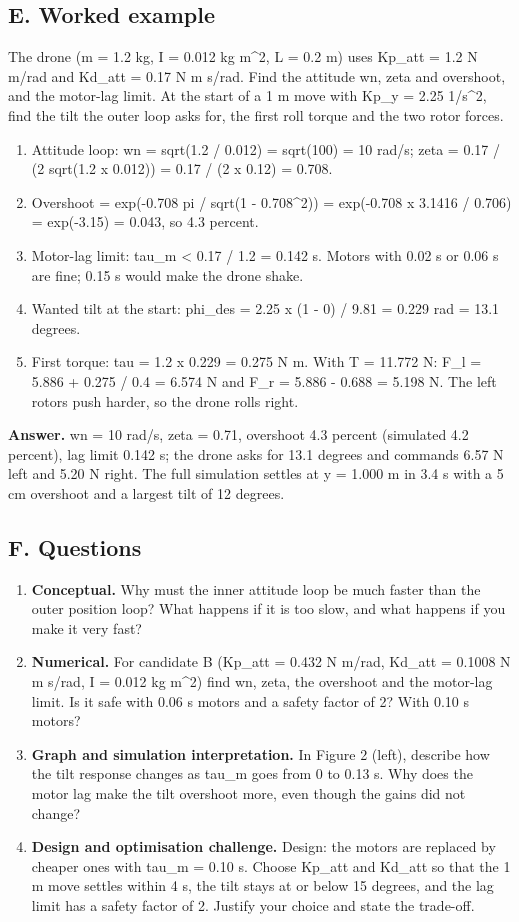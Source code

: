 \documentclass[11pt,a4paper]{article}
\begin{document}
\subsection*{E. Worked example}
The drone (m = 1.2 kg, I = 0.012 kg m\textasciicircum{}2, L = 0.2 m) uses Kp\_att = 1.2 N m/rad and Kd\_att = 0.17 N m s/rad. Find the attitude wn, zeta and overshoot, and the motor-lag limit. At the start of a 1 m move with Kp\_y = 2.25 1/s\textasciicircum{}2, find the tilt the outer loop asks for, the first roll torque and the two rotor forces.
\begin{enumerate}[nosep]
\item Attitude loop: wn = sqrt(1.2 / 0.012) = sqrt(100) = 10 rad/s; zeta = 0.17 / (2 sqrt(1.2 x 0.012)) = 0.17 / (2 x 0.12) = 0.708.
\item Overshoot = exp(-0.708 pi / sqrt(1 - 0.708\textasciicircum{}2)) = exp(-0.708 x 3.1416 / 0.706) = exp(-3.15) = 0.043, so 4.3 percent.
\item Motor-lag limit: tau\_m < 0.17 / 1.2 = 0.142 s. Motors with 0.02 s or 0.06 s are fine; 0.15 s would make the drone shake.
\item Wanted tilt at the start: phi\_des = 2.25 x (1 - 0) / 9.81 = 0.229 rad = 13.1 degrees.
\item First torque: tau = 1.2 x 0.229 = 0.275 N m. With T = 11.772 N: F\_l = 5.886 + 0.275 / 0.4 = 6.574 N and F\_r = 5.886 - 0.688 = 5.198 N. The left rotors push harder, so the drone rolls right.
\end{enumerate}
\textbf{Answer.} wn = 10 rad/s, zeta = 0.71, overshoot 4.3 percent (simulated 4.2 percent), lag limit 0.142 s; the drone asks for 13.1 degrees and commands 6.57 N left and 5.20 N right. The full simulation settles at y = 1.000 m in 3.4 s with a 5 cm overshoot and a largest tilt of 12 degrees.

\subsection*{F. Questions}
\begin{enumerate}[nosep]
\item \textbf{Conceptual.} Why must the inner attitude loop be much faster than the outer position loop? What happens if it is too slow, and what happens if you make it very fast?
\item \textbf{Numerical.} For candidate B (Kp\_att = 0.432 N m/rad, Kd\_att = 0.1008 N m s/rad, I = 0.012 kg m\textasciicircum{}2) find wn, zeta, the overshoot and the motor-lag limit. Is it safe with 0.06 s motors and a safety factor of 2? With 0.10 s motors?
\item \textbf{Graph and simulation interpretation.} In Figure 2 (left), describe how the tilt response changes as tau\_m goes from 0 to 0.13 s. Why does the motor lag make the tilt overshoot more, even though the gains did not change?
\item \textbf{Design and optimisation challenge.} Design: the motors are replaced by cheaper ones with tau\_m = 0.10 s. Choose Kp\_att and Kd\_att so that the 1 m move settles within 4 s, the tilt stays at or below 15 degrees, and the lag limit has a safety factor of 2. Justify your choice and state the trade-off.
\end{enumerate}
\end{document}
